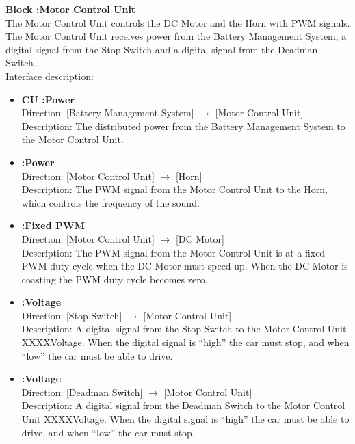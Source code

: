\textbf{Block :Motor Control Unit}\\
The Motor Control Unit controls the DC Motor and the Horn with PWM signals. The Motor Control Unit receives power from the Battery Management System, a digital signal from the Stop Switch and a digital signal from the Deadman Switch.\\
Interface description:

\begin{itemize}
	\item \textbf{CU :Power}\\
		Direction: [Battery Management System] $\rightarrow$ [Motor Control Unit]\\
		Description: The distributed power from the Battery Management System to the Motor Control Unit.
	\item \textbf{:Power}\\
		Direction: [Motor Control Unit] $\rightarrow$ [Horn]\\
		Description: The PWM signal from the Motor Control Unit to the Horn, which controls the frequency of the sound.
	\item \textbf{:Fixed PWM}\\
		Direction: [Motor Control Unit] $\rightarrow$ [DC Motor]\\
		Description: The PWM signal from the Motor Control Unit is at a fixed PWM duty cycle when the DC Motor must speed up. When the DC Motor is coasting the PWM duty cycle becomes zero.
	\item \textbf{:Voltage}\\
		Direction: [Stop Switch] $\rightarrow$ [Motor Control Unit]\\
		Description: A digital signal from the Stop Switch to the Motor Control Unit XXXXVoltage. When the digital signal is “high” the car must stop, and when “low” the car must be able to drive.
	\item \textbf{:Voltage}\\
		Direction: [Deadman Switch] $\rightarrow$ [Motor Control Unit]\\
		Description: A digital signal from the Deadman Switch to the Motor Control Unit XXXXVoltage. When the digital signal is “high” the car must be able to drive, and when “low” the car must stop.
\end{itemize}